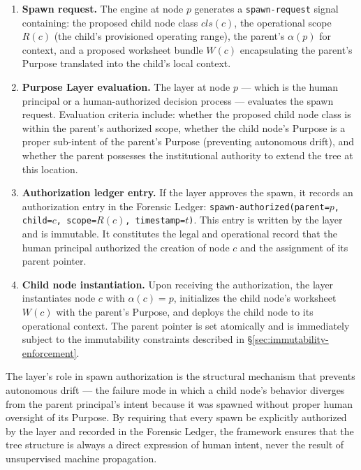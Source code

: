 \begin{enumerate}
\item[$\mathbf{S_1}$] \textbf{Spawn request.} The \bounds{} engine at node $p$ generates a \texttt{spawn-request} signal containing: the proposed child node class $cls(c)$, the operational scope $R(c)$ (the child's provisioned operating range), the parent's $\alpha(p)$ for context, and a proposed worksheet bundle $W(c)$ encapsulating the parent's Purpose translated into the child's local context.

\item[$\mathbf{S_2}$] \textbf{Purpose Layer evaluation.} The \purpose{} layer at node $p$ — which is the human principal or a human-authorized decision process — evaluates the spawn request. Evaluation criteria include: whether the proposed child node class is within the parent's authorized scope, whether the child node's Purpose is a proper sub-intent of the parent's Purpose (preventing autonomous drift), and whether the parent possesses the institutional authority to extend the tree at this location.

\item[$\mathbf{S_3}$] \textbf{Authorization ledger entry.} If the \purpose{} layer approves the spawn, it records an authorization entry in the Forensic Ledger: \texttt{spawn-authorized(parent=$p$, child=$c$, scope=$R(c)$, timestamp=$t$)}. This entry is written by the \fact{} layer and is immutable. It constitutes the legal and operational record that the human principal authorized the creation of node $c$ and the assignment of its parent pointer.

\item[$\mathbf{S_4}$] \textbf{Child node instantiation.} Upon receiving the authorization, the \fact{} layer instantiates node $c$ with $\alpha(c) = p$, initializes the child node's worksheet $W(c)$ with the parent's Purpose, and deploys the child node to its operational context. The parent pointer is set atomically and is immediately subject to the immutability constraints described in \S\ref{sec:immutability-enforcement}.
\end{enumerate}

The \purpose{} layer's role in spawn authorization is the structural mechanism that prevents autonomous drift — the failure mode in which a child node's behavior diverges from the parent principal's intent because it was spawned without proper human oversight of its Purpose. By requiring that every spawn be explicitly authorized by the \purpose{} layer and recorded in the Forensic Ledger, the framework ensures that the tree structure is always a direct expression of human intent, never the result of unsupervised machine propagation.

